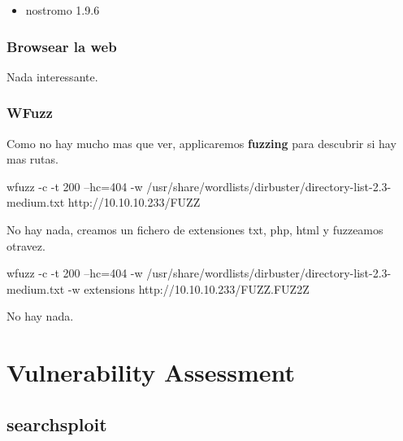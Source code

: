 \documentclass{assets/ipesethesis}
\newenvironment{Shaded}{\begin{snugshade}}{\end{snugshade}}
\newcommand{\ExtensionTok}[1]{#1}
\newcommand{\NormalTok}[1]{#1}
\providecommand{\tightlist}{%
  \setlength{\itemsep}{0pt}\setlength{\parskip}{0pt}}
\begin{document}
\begin{itemize}
\tightlist
\item
  nostromo 1.9.6
\end{itemize}

\hypertarget{browsear-la-web-1}{%
\subsubsection*{Browsear la web}\label{browsear-la-web-1}}

Nada interessante.

\hypertarget{wfuzz-1}{%
\subsubsection*{WFuzz}\label{wfuzz-1}}

Como no hay mucho mas que ver, applicaremos \textbf{fuzzing} para descubrir si hay mas rutas.

\begin{Shaded}
\begin{Highlighting}[]
\ExtensionTok{wfuzz}\NormalTok{ -c -t 200 --hc=404 -w /usr/share/wordlists/dirbuster/directory-list-2.3-medium.txt http://10.10.10.233/FUZZ}
\end{Highlighting}
\end{Shaded}

No hay nada, creamos un fichero de extensiones txt, php, html y fuzzeamos otravez.

\begin{Shaded}
\begin{Highlighting}[]
\ExtensionTok{wfuzz}\NormalTok{ -c -t 200 --hc=404 -w /usr/share/wordlists/dirbuster/directory-list-2.3-medium.txt -w extensions http://10.10.10.233/FUZZ.FUZ2Z}
\end{Highlighting}
\end{Shaded}

No hay nada.

\hypertarget{vulnerability-assessment-1}{%
\section*{Vulnerability Assessment}\label{vulnerability-assessment-1}}

\hypertarget{searchsploit-1}{%
\subsection*{searchsploit}\label{searchsploit-1}}
\end{document}

